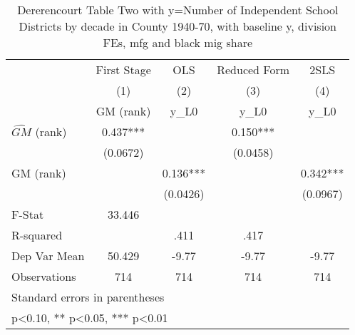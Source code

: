 \begin{table}[htbp]\centering
\def\sym#1{\ifmmode^{#1}\else\(^{#1}\)\fi}
\caption{Dererencourt Table Two with y=Number of Independent School Districts by decade in County 1940-70, with baseline y, division FEs, mfg and black mig share}
\begin{tabular}{l*{4}{c}}
\toprule
                    & First Stage   &         OLS   &Reduced Form   &        2SLS   \\
                    &\multicolumn{1}{c}{(1)}&\multicolumn{1}{c}{(2)}&\multicolumn{1}{c}{(3)}&\multicolumn{1}{c}{(4)}\\
                    &\multicolumn{1}{c}{GM  (rank)}&\multicolumn{1}{c}{y\_L0}&\multicolumn{1}{c}{y\_L0}&\multicolumn{1}{c}{y\_L0}\\
\midrule
$\hat{GM}$ (rank)   &       0.437***&               &       0.150***&               \\
                    &    (0.0672)   &               &    (0.0458)   &               \\
\addlinespace
GM  (rank)          &               &       0.136***&               &       0.342***\\
                    &               &    (0.0426)   &               &    (0.0967)   \\
\midrule
F-Stat              &      33.446   &               &               &               \\
R-squared           &               &        .411   &        .417   &               \\
Dep Var Mean        &      50.429   &       -9.77   &       -9.77   &       -9.77   \\
Observations        &         714   &         714   &         714   &         714   \\
\bottomrule
\multicolumn{5}{l}{\footnotesize Standard errors in parentheses}\\
\multicolumn{5}{l}{\footnotesize * p<0.10, ** p<0.05, *** p<0.01}\\
\end{tabular}
\end{table}

